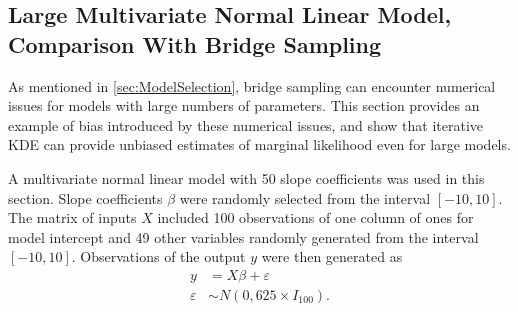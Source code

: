 \documentclass[twocolumn]{article}
\newcommand{\ep}{\varepsilon}
\begin{document}
\subsection{Large Multivariate Normal Linear Model, Comparison With Bridge Sampling}
\label{sec:BridgeSimulation}

As mentioned in \cref{sec:ModelSelection}, bridge sampling can encounter numerical issues for models with large numbers of parameters. This section provides an example of bias introduced by these numerical issues, and show that iterative KDE can provide unbiased estimates of marginal likelihood even for large models.

A multivariate normal linear model with 50 slope coefficients was used in this section. Slope coefficients $\beta$ were randomly selected from the interval $[-10, 10]$. The matrix of inputs $X$ included 100 observations of one column of ones for model intercept and 49 other variables randomly generated from the interval $[-10, 10]$. Observations of the output $y$ were then generated as
\begin{subequations}
	\begin{align}
	y &= X\beta + \ep\\
	\ep &\sim N(0, 625\times I_{100}).
	\end{align}
\end{subequations}
\end{document}
